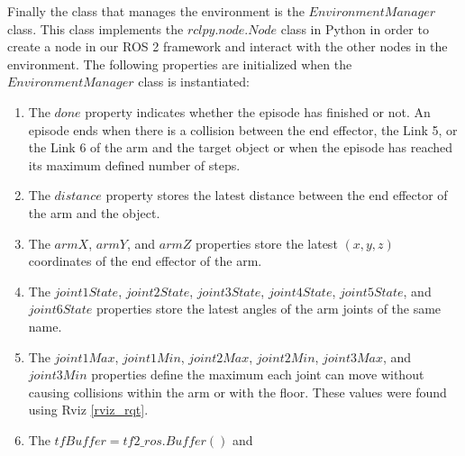 \documentclass[12pt,oneside]{article}
\begin{document}
Finally the class that manages the environment is the $EnvironmentManager$ class. This class implements the $rclpy.node.Node$ class in Python in order to create a node in our ROS 2 framework and interact with the other nodes in the environment.
The following properties are initialized when the $EnvironmentManager$ class is instantiated:
\begin{enumerate}
\item The $done$ property indicates whether the episode has finished or not. An episode ends when there is a collision between the end effector, the Link 5, or the Link 6 of the arm and the target object or when the episode has reached its maximum defined number of steps.
\item\label{env-manager:distance} The $distance$ property stores the latest distance between the end effector of the arm and the object.
\item\label{env-manager:arm-coordinates} The $armX$, $armY$, and $armZ$ properties store the latest $(x, y, z)$ coordinates of the end effector of the arm.
\item The $joint1State$, $joint2State$, $joint3State$, $joint4State$, $joint5State$, and $joint6State$ properties store the latest angles of the arm joints of the same name. 
\item The $joint1Max$, $joint1Min$, $joint2Max$, $joint2Min$, $joint3Max$, and $joint3Min$ properties define the maximum each joint can move without causing collisions within the arm or with the floor. These values were found using Rviz \ref{rviz_rqt}.
\item The $tfBuffer = tf2\_ros.Buffer()$ and


\end{enumerate}
\end{document}
